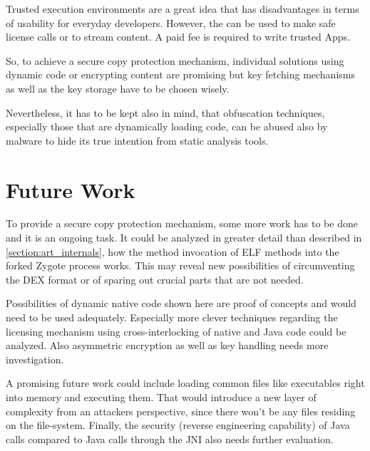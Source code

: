 Trusted execution environments are a great idea that has disadvantages
in terms of usability for everyday developers.
However, the can be used to make safe license calls or to stream content.
A paid fee is required to write trusted Apps.

So, to achieve a secure copy protection mechanism, individual solutions
using dynamic code or encrypting content are promising but key fetching mechanisms as well as the key storage have to be chosen wisely.

Nevertheless, it has to be kept also in mind, that obfuscation techniques, especially those that are dynamically loading code, can be abused also by malware to hide its true intention from static analysis tools.

\section{Future Work}\label{section:future_work}
To provide a secure copy protection mechanism, some more work has to
be done and it is an ongoing task. It could be analyzed in greater detail
than described in \autoref{section:art_internals},
how the method invocation of ELF methods into the forked Zygote process works. This may reveal new possibilities of circumventing
the DEX format or of sparing out crucial parts that are not needed.

Possibilities of dynamic native code shown here are proof of concepts and would need to be used adequately. Especially more clever techniques regarding
the licensing mechanism using cross-interlocking of native and Java code could be analyzed.
Also asymmetric encryption as well as key handling needs more investigation.

A promising future work could include loading common files
like executables right into memory and executing them. That would introduce
a new layer of complexity from an attackers perspective, since there won't be
any files residing on the file-system. Finally, the security (reverse engineering capability) of Java calls compared to Java calls through the JNI also needs further evaluation.
